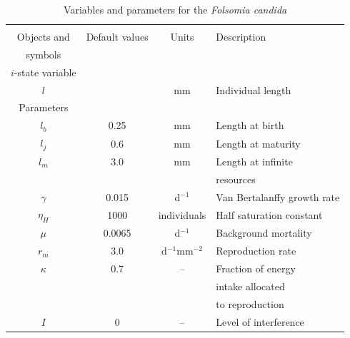 \begin{table}
\caption{\label{tab:param}Variables and parameters for the \textit{Folsomia candida}}
\begin{tabular}{cccl}
\hline
\hline 
 & & &\\
 Objects and  & Default values & Units & Description\\ 
symbols & & &\\
\hline
	$i$-state variable & & & \\ 
	$l$ &   & mm & Individual length \\ 
	Parameters & & & \\ 
	$l_{b}$ & 0.25 & mm & Length at birth \\ 
	$l_{j}$ & 0.6 & mm & Length at maturity \\ 
	$l_{m}$ & 3.0 & mm & Length at infinite\\
	& & &  resources \\ 
	$\gamma$ & 0.015 & d$^{-1}$ & Van Bertalanffy growth rate \\ 
	$\eta_{H}$ & 1000 & individuals & Half saturation constant \\ 
	$\mu$ & 0.0065 & d$^{-1}$ & Background mortality \\ 
	$r_{m}$ & 3.0 & d$^{-1}$mm$^{-2}$ & Reproduction rate \\ 
	$\kappa$ & 0.7 & -- & Fraction of energy \\
	  &   &   & intake allocated \\
	  &   &   & to reproduction \\ 
	  $I$ & 0 & -- & Level of interference\\
\hline 
\end{tabular} 
\end{table}


